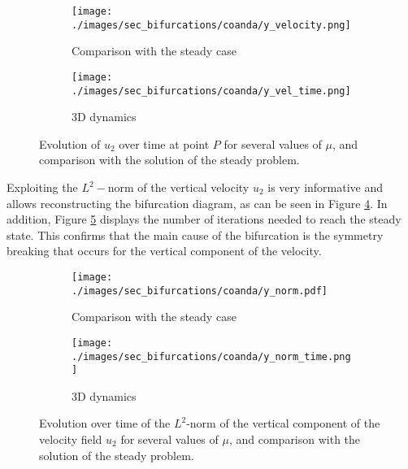 \documentclass[reqno]{amsart}[standalone]
\theoremstyle{definition}
\theoremstyle{remark}
\begin{document}
\begin{figure}[ht]
\centering

\begin{subfigure}{0.48\linewidth}
\centering
\texttt{[image: ./images/sec\_bifurcations/coanda/y\_velocity.png]}
\caption{Comparison with the steady case}
\label{fig:vert_vel_1}
\end{subfigure}
\hspace{0.2cm}
\begin{subfigure}{0.48\linewidth}
\centering
\texttt{[image: ./images/sec\_bifurcations/coanda/y\_vel\_time.png]}
\caption{3D dynamics}
\label{fig:vert_vel_2}
\end{subfigure}

\caption{Evolution of $u_2$ over time at point $P$ for several values of $\mu$, and comparison with the solution of the steady problem.}
%
\label{figVERTVEL}
\end{figure}

%
%


%
Exploiting the $L^2-$norm of the vertical velocity $u_2$ is very informative and allows reconstructing the bifurcation diagram, as can be seen in Figure \ref{fig:norm_1}.
In addition, Figure \ref{fig:norm_2} displays the number of iterations needed to reach the steady state.
This %
confirms that the main cause of the bifurcation is the symmetry breaking that occurs for the vertical component of the velocity.

\begin{figure}[ht]
\centering

\begin{subfigure}{0.49\linewidth}
\centering
\texttt{[image: ./images/sec\_bifurcations/coanda/y\_norm.pdf]}
\caption{Comparison with the steady case}
\label{fig:norm_1}
\end{subfigure}
\vspace{0.6cm}
\begin{subfigure}{0.49\linewidth}
\centering
\texttt{[image: ./images/sec\_bifurcations/coanda/y\_norm\_time.png]}
\caption{3D dynamics}
\label{fig:norm_2}
\end{subfigure}

\caption{Evolution over time of the $L^2$-norm of the vertical component of the velocity field $u_2$ for several values of $\mu$, and comparison with the solution of the steady problem.}
%
\label{figNORMy}
\end{figure}
\end{document}
